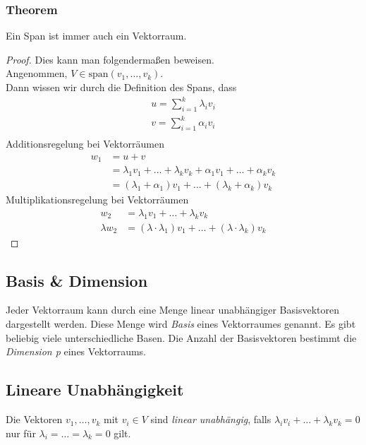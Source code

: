 \subsubsection*{Theorem}
Ein Span ist immer auch ein Vektorraum. \\
\begin{proof} 
Dies kann man folgenderma\ss en beweisen. \\
Angenommen, $V \in \text{span}(v_1,\dots,v_k)$.\\
Dann wissen wir durch die Definition des Spans, dass\\
\begin{align*}
u = \sum\limits_{i=1}^{k} \lambda_iv_i \\
v = \sum\limits_{i=1}^{k} \alpha_iv_i \\      
\end{align*}
Additionsregelung bei Vektorr\"aumen
\begin{align*}
	w_1 &= u+v\\
	&=\lambda_1 v_1+\dots+\lambda_k v_k+\alpha_1 v_1+\dots+\alpha_k v_k \\
	&=(\lambda_1+\alpha_1) v_1+\dots+(\lambda_k+\alpha_k) v_k
\end{align*}
Multiplikationsregelung bei Vektorr\"aumen 
\begin{align*}
	w_2 &= \lambda_1 v_1+\dots+\lambda_k v_k\\
	\lambda w_2 &= (\lambda \cdot \lambda_1) v_1+\dots+(\lambda \cdot \lambda_k)v_k
\end{align*}
\end{proof}



\subsection{Basis \& Dimension}
Jeder Vektorraum kann durch eine Menge linear unabh\"angiger Basisvektoren dargestellt werden. Diese Menge wird \textit{Basis} eines Vektorraumes genannt. Es gibt beliebig viele unterschiedliche Basen. Die Anzahl der Basisvektoren bestimmt die \textit{Dimension p} eines Vektorraums.



\subsection{Lineare Unabh\"angigkeit}
Die Vektoren $v_1,\dots,v_k$ mit $v_i \in V$ sind \textit{linear unabh\"angig}, falls $\lambda_iv_i+\dots+\lambda_kv_k = 0$ nur f\"ur $\lambda_i=\dots=\lambda_k= 0$ gilt. 

%
